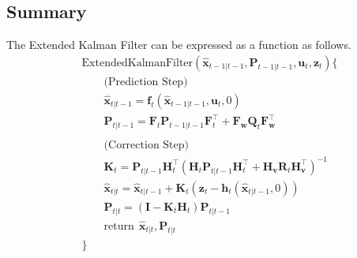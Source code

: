 \documentclass[10pt]{article}
\begin{document}
	\subsection{Summary}
	 The Extended Kalman Filter can be expressed as a function as follows.
	\begin{equation} 
		\boxed{ \begin{aligned} 
				& \text{ExtendedKalmanFilter}(\hat{\mathbf{x}}_{t-1|t-1}, \mathbf{P}_{t-1|t-1}, \mathbf{u}_{t}, \mathbf{z}_{t}) \{ \\ 
				& \quad\quad \text{(Prediction Step)}\\ 
				& \quad\quad \hat{\mathbf{x}}_{t|t-1} = \mathbf{f}_{t}(\hat{\mathbf{x}}_{t-1|t-1},  \mathbf{u}_{t} , 0  ) \\ 
				& \quad\quad \mathbf{P}_{t|t-1} = \mathbf{F}_{t}\mathbf{P}_{t-1|t-1}\mathbf{F}_{t}^{\intercal} + \mathbf{F}_{\mathbf{w}}\mathbf{Q}_{t} \mathbf{F}_{\mathbf{w}}^{\intercal} \\ 
				& \\ 
				& \quad\quad \text{(Correction Step)} \\ 
				& \quad\quad \mathbf{K}_{t} = \mathbf{P}_{t|t-1}\mathbf{H}_{t}^{\intercal}(\mathbf{H}_{t}\mathbf{P}_{t|t-1}\mathbf{H}_{t}^{\intercal} + \mathbf{H}_{\mathbf{v}}\mathbf{R}_{t} \mathbf{H}_{\mathbf{v}}^{\intercal} )^{-1} \\ 
				& \quad\quad \hat{\mathbf{x}}_{t|t} = \hat{\mathbf{x}}_{t|t-1} + \mathbf{K}_{t}( \mathbf{z}_{t} - \mathbf{h}_{t}(\hat{\mathbf{x}}_{t|t-1}, 0)) \\ 
				& \quad\quad \mathbf{P}_{t|t} = (\mathbf{I} - \mathbf{K}_{t}\mathbf{H}_{t})\mathbf{P}_{t|t-1} \\ 
				& \quad\quad \text{return} \ \ \hat{\mathbf{x}}_{t|t}, \mathbf{P}_{t|t} \\ 
				&   \} 
		\end{aligned} }
	\end{equation}
	
\end{document}
